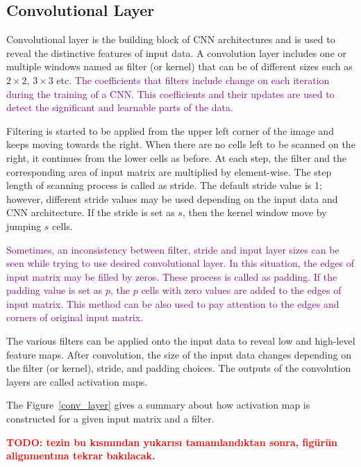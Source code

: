 \subsection{Convolutional Layer}

Convolutional layer is the building block of CNN architectures and is used to reveal the distinctive features of input data. A convolution layer includes one or multiple windows named as filter (or kernel) that can be of different sizes such as $2 \times 2$, $3\times3$ etc. \textcolor{purple}{The coefficients that filters include change on each iteration during the training of a CNN. This coefficients and their updates are used to detect the significant and learnable parts of the data.}

Filtering is started to be applied from the upper left corner of the image and keeps moving towards the right. When there are no cells left to be scanned on the right, it continues from the lower cells as before. At each step, the filter and the corresponding area of input matrix are multiplied by element-wise. The step length of scanning process is called as stride. The default stride value is 1; however, different stride values may be used depending on the input data and CNN architecture. If the stride is set as $s$, then the kernel window move by jumping $s$ cells. 

\textcolor{purple}{Sometimes, an inconsistency between filter, stride and input layer sizes can be seen while trying to use desired convolutional layer. In this situation, the edges of input matrix may be filled by zeros. These process is called as padding. If the padding value is set as $p$, the $p$ cells with zero values are added to the edges of input matrix. This method can be also used to pay attention to the edges and corners of original input matrix.}

The various filters can be applied onto the input data to reveal low and high-level feature maps. After convolution, the size of the input data changes depending on the filter (or kernel), stride, and padding choices. The outputs of the convolution layers are called activation maps.

The Figure~\ref{conv_layer} gives a summary about how activation map is constructed for a given input matrix and a filter.

\textcolor{red}{\textbf{TODO: tezin bu kısmından yukarısı tamamlandıktan sonra, figürün alignmentına tekrar bakılacak.}}

